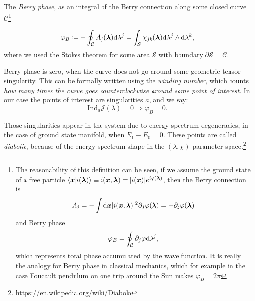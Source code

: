 \begin{definition}
    
    The \emph{Berry phase}, as an integral of the Berry connection along some closed curve $\mathcal{C}$\footnote{
        The reasonability of this definition can be seen, if we assume the ground state of a free particle
        $\braket{\bm{x}|i({\bm\lambda})}\equiv i(\bm{x},{\bm\lambda})= |i(\bm{x})|e^{i\varphi({\bm\lambda})}$,
        then the Berry connection is
        \begin{equation}
            A_j=-\int \mathrm{d} \bm{x}|i(\bm{x},{\bm\lambda})|^2\partial_j \varphi({\bm\lambda}) = -\partial_j \varphi({\bm\lambda})
        \end{equation} 
        and Berry phase
        \begin{equation}
            \varphi_B=\oint_\mathcal{C} \partial_j \varphi \mathrm{d} \lambda^j,
        \end{equation}
        which represents total phase accumulated by the wave function. It is really the analogy for Berry phase in classical mechanics, which for example in the case Foucault pendulum on one trip around the Sun makes $\varphi_B=2\pi$
        }

    \begin{equation}
        \varphi_B\coloneqq-\oint_\mathcal{C} A_j({\bm\lambda})\mathrm{d} \lambda^j=\int_\mathcal{S} \chi_{jk}({\bm\lambda})\mathrm{d} \lambda^j \wedge \mathrm{d}\lambda^k,
    \end{equation}
    where we used the Stokes theorem for some area $\mathcal{S}$ with boundary $\partial\mathcal{S}=\mathcal{C}$.    
    
\end{definition}

Berry phase is zero, when the curve does not go around some geometric tensor singularity. This can be formally written using the \emph{winding number}, which counts \emph{how many times the curve goes counterclockwise around some point of interest}. In our case the points of interest are singularities $a$, and we say:
$$\mathrm{Ind}_a \mathcal J(\lambda)=0 \Rightarrow \varphi_B=0.$$

Those singularities appear in the system due to energy spectrum degeneracies, in the case of ground state manifold, when $E_1-E_0=0$. These points are called \emph{diabolic}, because of the energy spectrum shape in the $(\lambda,\chi)$ parameter space.\footnote{https://en.wikipedia.org/wiki/Diabolo}




















